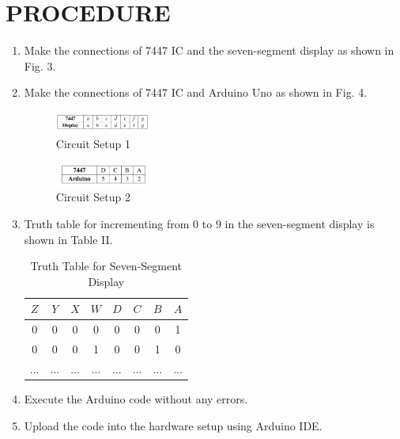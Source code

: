 \documentclass[conference]{IEEEtran}
\begin{document}
\section{PROCEDURE}
\begin{enumerate}
\item Make the connections of 7447 IC and the seven-segment display as shown in Fig. 3.
\item Make the connections of 7447 IC and Arduino Uno as shown in Fig. 4.

\begin{figure}[htbp] 
\centering 
\includegraphics[width=0.3\textwidth]{IMG-20241119-WA0004.jpg}
\caption{\label{fig-3:Gates} Circuit Setup 1}    
\end{figure}

\begin{figure}[htbp]                     
\centering                           
\includegraphics[width=0.3\textwidth]{IMG-20241119-WA0003.jpg}                                 
\caption{\label{fig-4:Gates} Circuit Setup 2}         
\end{figure}

\item Truth table for incrementing from $0$ to $9$ in the seven-segment display is shown in Table II.

\begin{table}[htbp]
\centering
\begin{tabular}{| c | c | c | c | c | c | c | c |} 
\hline
$Z$ & $Y$ & $X$ & $W$ & $D$ & $C$ & $B$ & $A$ \\
\hline
0   & 0   & 0   & 0   & 0  & 0 & 0  & 1 \\
0   & 0   & 0   & 1   & 0  & 0 & 1  & 0 \\
... & ... & ... & ... & ... & ... & ... & ... \\ 
\hline
\end{tabular}
\vspace{0.15cm}
\caption{\label{tab:widgets} Truth Table for Seven-Segment Display}
\end{table}

\item Execute the Arduino code without any errors.
\item Upload the code into the hardware setup using Arduino IDE.
\end{enumerate}
\end{document}
